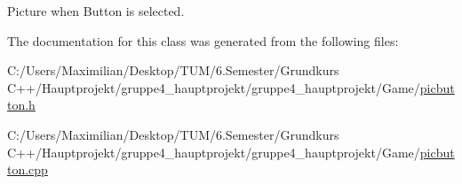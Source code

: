 Picture when Button is selected. 



The documentation for this class was generated from the following files\+:\begin{DoxyCompactItemize}
\item 
C\+:/\+Users/\+Maximilian/\+Desktop/\+T\+U\+M/6.\+Semester/\+Grundkurs C++/\+Hauptprojekt/gruppe4\+\_\+hauptprojekt/gruppe4\+\_\+hauptprojekt/\+Game/\hyperlink{picbutton_8h}{picbutton.\+h}\item 
C\+:/\+Users/\+Maximilian/\+Desktop/\+T\+U\+M/6.\+Semester/\+Grundkurs C++/\+Hauptprojekt/gruppe4\+\_\+hauptprojekt/gruppe4\+\_\+hauptprojekt/\+Game/\hyperlink{picbutton_8cpp}{picbutton.\+cpp}\end{DoxyCompactItemize}
